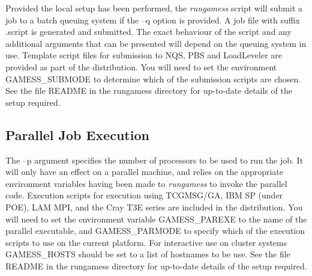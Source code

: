 \documentclass[11pt,fleqn]{article}
\begin{document}
Provided the local setup has been performed, the {\em rungamess}
script will submit a job to a batch queuing system if the --q option is
provided. A job file with suffix .script is generated and
submitted. The exact behaviour of the script and any additional arguments that can
be presented will depend on the queuing system in use.  
Template script files for submission to NQS, PBS and LoadLeveler are 
provided as part of the distribution. You will need to set the 
environment GAMESS\_SUBMODE to determine which of the submission
scripts are chosen. See the file README in the
rungamess directory for up-to-date details of the setup required.

\subsection[Parallel Job Execution]{Parallel Job Execution}

The --p argument specifies the number of processors to be used to run
the job.  It will only have an effect on a parallel machine, and
relies on the appropriate environment variables having been made to
{\em rungamess} to invoke the parallel code. Execution scripts for
execution using TCGMSG/GA, IBM SP (under POE), LAM MPI, and the Cray
T3E series are included in the distribution.  You will need to set the
environment variable GAMESS\_PAREXE to the name of the parallel
executable, and GAMESS\_PARMODE to specify which of the execution
scripts to use on the current platform.  For interactive use on cluster
systems GAMESS\_HOSTS should be set to a list of hostnames to be 
use. See the file README in the
rungamess directory for up-to-date details of the setup required.

%
%
\end{document}
